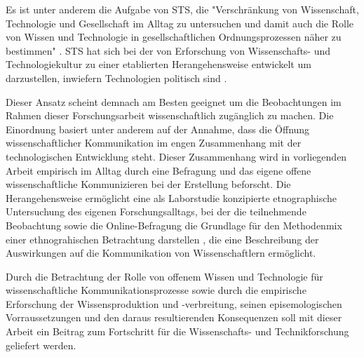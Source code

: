 Es ist unter anderem die Aufgabe von STS, die "Verschränkung von Wissenschaft, Technologie und Gesellschaft im Alltag zu untersuchen und damit auch die Rolle von Wissen und Technologie in gesellschaftlichen Ordnungsprozessen näher zu bestimmen" \cite{beck_2014_science}. STS hat sich bei der von Erforschung von Wissenschafts- und Technologiekultur zu einer etablierten Herangehensweise entwickelt um darzustellen, inwiefern Technologien politisch sind \cite{kelty_2014_freedom}.

Dieser Ansatz scheint demnach am Besten geeignet um die Beobachtungen im Rahmen dieser Forschungsarbeit wissenschaftlich zugänglich zu machen. Die Einordnung basiert unter anderem auf der Annahme, dass die Öffnung wissenschaftlicher Kommunikation im engen Zusammenhang mit der technologischen Entwicklung steht. Dieser Zusammenhang wird in vorliegenden Arbeit empirisch im Alltag durch eine Befragung und das eigene offene wissenschaftliche Kommunizieren bei der Erstellung beforscht. Die Herangehensweise ermöglicht eine als Laborstudie konzipierte etnographische Untersuchung des eigenen Forschungsalltags, bei der die teilnehmende Beobachtung sowie die Online-Befragung die Grundlage für den Methodenmix einer ethnograhischen Betrachtung darstellen \cite{bachmann_2011_ethnographie}, die eine Beschreibung der Auswirkungen auf die Kommunikation von Wissenschaftlern ermöglicht.

Durch die Betrachtung der Rolle von offenem Wissen und Technologie für wissenschaftliche Kommunikationsprozesse sowie durch die empirische Erforschung der Wissensproduktion und -verbreitung, seinen episemologischen Vorraussetzungen und den daraus resultierenden Konsequenzen \cite{beck_2014_science} soll mit dieser Arbeit ein Beitrag zum Fortschritt für die Wissenschafts- und Technikforschung geliefert werden.

